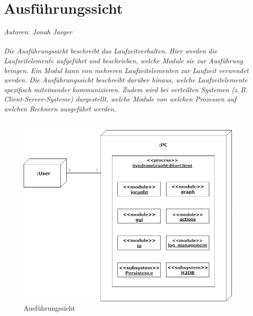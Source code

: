 \documentclass[enabledeprecatedfontcommands,fontsize=11pt,paper=a4,twoside]{scrartcl}
\begin{document}













\newpage
\section{Ausführungssicht}
\label{sec:ausfuehrung}
\emph{Autoren: Jonah Jaeger}\\ \\
 
{\it
Die Ausführungssicht beschreibt das Laufzeitverhalten. Hier
werden die Laufzeitelemente aufgeführt und beschrieben, welche Module
sie zur Ausführung bringen. Ein Modul kann von mehreren
Laufzeitelementen zur Laufzeit verwendet werden. Die Ausführungssicht
beschreibt darüber hinaus, welche Laufzeitelemente spezifisch
miteinander kommunizieren. Zudem wird bei verteilten Systemen
(z.\,B. Client-Server-Systeme) dargestellt, welche Module von welchen
Prozessen auf welchen Rechnern ausgeführt werden.}\\ \\

\begin{figure}[ht]
	\centering
	\includegraphics[width=1\textwidth]{ausfuehrungssicht.png}
	\caption{Ausführungssicht}
\end{figure}
\end{document}
